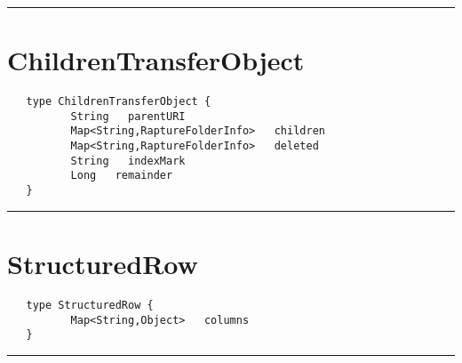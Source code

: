 \rule{15cm}{2pt}
\section{ChildrenTransferObject}
\label{type:ChildrenTransferObject}

\begin{verbatim}
   type ChildrenTransferObject {
          String   parentURI
          Map<String,RaptureFolderInfo>   children
          Map<String,RaptureFolderInfo>   deleted
          String   indexMark
          Long   remainder
   }
\end{verbatim}

\rule{15cm}{2pt}
\section{StructuredRow}
\label{type:StructuredRow}

\begin{verbatim}
   type StructuredRow {
          Map<String,Object>   columns
   }
\end{verbatim}

\rule{15cm}{2pt}
